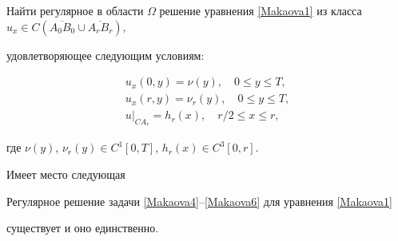 \begin{task}

Найти регулярное в области $\Omega$ решение уравнения \eqref{Makaova1} из класса $u_{x} \in C(\overline{A_0B_0} \cup \overline{A_rB_r}), $

удовлетворяющее следующим условиям{\rm:}

\begin{gather}

\label{Makaova4} 

u_x(0,y)=\nu(y), \quad  0\leq y\leq T, 

\\

\label{Makaova5} 

u_x(r,y)=\nu_r(y), \quad  0\leq y\leq T, 

\\

\label{Makaova6} 

u|_{CA_r}=h_r(x), \quad   r/2 \leq x\leq r, 

\end{gather}

где  $\nu(y)$, $\nu_r(y) \in C^1[0,T]$, $h_r(x)\in C^3[0,r]$.

\end{task}



\smallskip





Имеет место следующая 

\smallskip



\begin{theorem} Регулярное решение задачи  \eqref{Makaova4}--\eqref{Makaova6} для уравнения \eqref{Makaova1}

существует и оно единственно\rm.

\end{theorem} 



\smallskip



